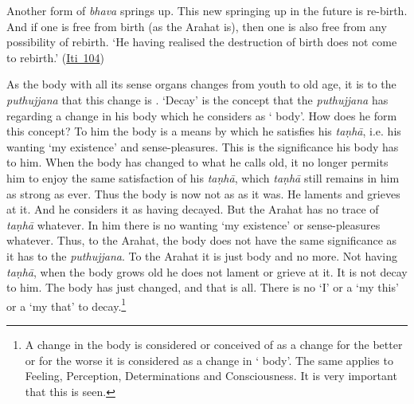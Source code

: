 Another form of \emph{bhava} springs up. This new springing up in the future is re-birth. And if one is free from birth (as the Arahat is), then one is also free from any possibility of rebirth. `He having realised the destruction of birth does not come to rebirth.' (\href{https://suttacentral.net/iti104/en/sujato}{Iti~104})

As the body with all its sense organs changes from youth to old age, it is to the \emph{puthujjana} that this change is . `Decay' is the concept that the \emph{puthujjana} has regarding a change in his body which he considers as ` body'. How does he form this concept? To him the body is a means by which he satisfies his \emph{taṇhā}, i.e. his wanting `my existence' and sense-pleasures. This is the significance his body has to him. When the body has changed to what he calls old, it no longer permits him to enjoy the same satisfaction of his \emph{taṇhā}, which \emph{taṇhā} still remains in him as strong as ever. Thus the body is now not as  as it was. He laments and grieves at it. And he considers it as having decayed. But the Arahat has no trace of \emph{taṇhā} whatever. In him there is no wanting `my existence' or sense-pleasures whatever. Thus, to the Arahat, the body does not have the same significance as it has to the \emph{puthujjana}. To the Arahat it is just body and no more. Not having \emph{taṇhā}, when the body grows old he does not lament or grieve at it. It is not decay to him. The body has just changed, and that is all. There is no `I' or a `my this' or a `my that' to decay.\footnote{A change in the body is considered or conceived of as a change for the better or for the worse  it is considered as a change in ` body'. The same applies to Feeling, Perception, Determinations and Consciousness. It is very important that this is seen.}

